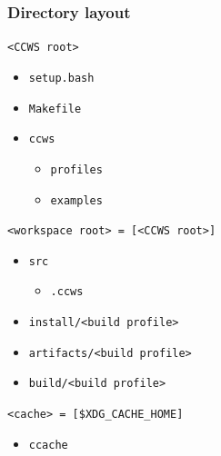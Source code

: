 \documentclass[hyperref={colorlinks=false, breaklinks=true},11pt]{beamer}
\begin{document}
\begin{frame}
    \frametitle{Directory layout}

    \begin{block}{\texttt{<CCWS root>}}
        \begin{itemize}
            \item[] \texttt{setup.bash}
            \item[] \texttt{Makefile}
            \item[] \texttt{ccws}
                \begin{itemize}
                    \item[] \texttt{profiles}
                    \item[] \texttt{examples}
                \end{itemize}
        \end{itemize}
    \end{block}

    \begin{block}{\texttt{<workspace root> = [<CCWS root>]}}
        \begin{itemize}
            \item[] \texttt{src}
                \begin{itemize}
                    \item[] \texttt{.ccws}
                \end{itemize}
            \item[] \texttt{install/<build profile>}
            \item[] \texttt{artifacts/<build profile>}
            \item[] \texttt{build/<build profile>}
        \end{itemize}
    \end{block}

    \begin{block}{\texttt{<cache> = [\$XDG\_CACHE\_HOME]}}
        \begin{itemize}
            \item[] \texttt{ccache}
        \end{itemize}
    \end{block}
\end{frame}
\end{document}
